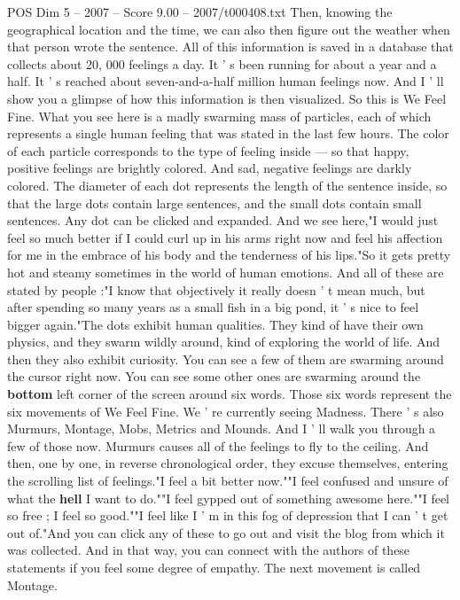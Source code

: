\begin{textsample}{POS Dim 5 – 2007 – Score 9.00 – 2007/t000408.txt}
Then, knowing the geographical location and the time, we can also then figure out the weather when that person wrote the sentence.
All of this information is saved in a database that collects about 20, 000 feelings a day.
It ' s been running for about a year and a half.
It ' s reached about seven-and-a-half million human feelings now.
And I ' ll show you a glimpse of how this information is then visualized.
So this is We Feel Fine.
What you see here is a madly swarming mass of particles, each of which represents a single human feeling that was stated in the last few hours.
The color of each particle corresponds to the type of feeling inside — so that happy, positive feelings are brightly colored.
And sad, negative feelings are darkly colored.
The diameter of each dot represents the length of the sentence inside, so that the large dots contain large sentences, and the small dots contain small sentences.
Any dot can be clicked and expanded.
And we see here,"I would just feel so much better if I could curl up in his arms right now and feel his affection for me in the embrace of his body and the tenderness of his lips."So it gets pretty hot and steamy sometimes in the world of human emotions.
And all of these are stated by people :"I know that objectively it really doesn ' t mean much, but after spending so many years as a small fish in a big pond, it ' s nice to feel bigger again."The dots exhibit human qualities.
They kind of have their own physics, and they swarm wildly around, kind of exploring the world of life.
And then they also exhibit curiosity.
You can see a few of them are swarming around the cursor right now.
You can see some other ones are swarming around the \textbf{bottom} left corner of the screen around six words.
Those six words represent the six movements of We Feel Fine.
We ' re currently seeing Madness.
There ' s also Murmurs, Montage, Mobs, Metrics and Mounds.
And I ' ll walk you through a few of those now.
Murmurs causes all of the feelings to fly to the ceiling.
And then, one by one, in reverse chronological order, they excuse themselves, entering the scrolling list of feelings."I feel a bit better now.""I feel confused and unsure of what the \textbf{hell} I want to do.""I feel gypped out of something awesome here.""I feel so free ; I feel so good.""I feel like I ' m in this fog of depression that I can ' t get out of."And you can click any of these to go out and visit the blog from which it was collected.
And in that way, you can connect with the authors of these statements if you feel some degree of empathy.
The next movement is called Montage.

\end{textsample}
